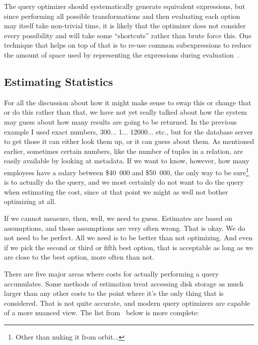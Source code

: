 \documentclass[a4paper]{report}
\begin{document}
The query optimizer should systematically generate equivalent expressions, but since performing all possible transformations and then evaluating each option may itself take non-trivial time, it is likely that the optimizer does not consider every possibility and will take some ``shortcuts'' rather than brute force this. One technique that helps on top of that is to re-use common subexpressions to reduce the amount of space used by representing the expressions during evaluation~\cite{dsc}.

\subsection*{Estimating Statistics}

For all the discussion about how it might make sense to swap this or change that or do this rather than that, we have not yet really talked about how the system may guess about how many results are going to be returned. In the previous example I used exact numbers, 300... 1... 12000... etc., but for the database server to get those it can either look them up, or it can guess about them. As mentioned earlier, sometimes certain numbers, like the number of tuples in a relation, are easily available by looking at metadata. If we want to know, however, how many employees have a salary between \$40~000 and \$50~000, the only way to be sure\footnote{Other than nuking it from orbit...} is to actually do the query, and we most certainly do not want to do the query when estimating the cost, since at that point we might as well not bother optimizing at all.

If we cannot measure, then, well, we need to guess. Estimates are based on assumptions, and those assumptions are very often wrong. That is okay. We do not need to be perfect. All we need is to be better than not optimizing. And even if we pick the second or third or fifth best option, that is acceptable as long as we are close to the best option, more often than not.

There are five major areas where costs for actually performing a query accumulates. Some methods of estimation treat accessing disk storage as much larger than any other costs to the point where it's the only thing that is considered. That is not quite accurate, and modern query optimizers are capable of a more nuanced view. The list from~\cite{fds} below is more complete:
\end{document}

